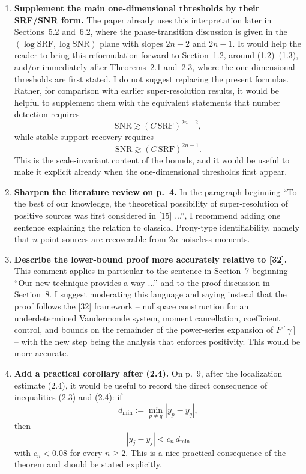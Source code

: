 \documentclass[11pt]{article}
\begin{document}
\begin{enumerate}[leftmargin=2.2em]
\item \textbf{Supplement the main one-dimensional thresholds by their SRF/SNR form.} The
paper already uses this interpretation later in Sections~5.2 and~6.2, where the phase-transition
discussion is given in the $(\log\mathrm{SRF},\log\mathrm{SNR})$ plane with slopes $2n-2$ and
$2n-1$. It would help the reader to bring this reformulation forward to Section~1.2, around
(1.2)--(1.3), and/or immediately after Theorems~2.1 and~2.3, where the one-dimensional
thresholds are first stated. I do not suggest replacing the present formulas. Rather, for
comparison with earlier super-resolution results, it would be helpful to supplement them with the
equivalent statements that number detection requires
\[
\mathrm{SNR}\gtrsim (C\,\mathrm{SRF})^{2n-2},
\]
while stable support recovery requires
\[
\mathrm{SNR}\gtrsim (C\,\mathrm{SRF})^{2n-1}.
\]
This is the scale-invariant content of the bounds, and it would be useful to make it explicit
already when the one-dimensional thresholds first appear.

\item \textbf{Sharpen the literature review on p.~4.} In the paragraph beginning ``To the best of
our knowledge, the theoretical possibility of super-resolution of positive sources was first
considered in [15] ...'', I recommend adding one sentence explaining the relation to classical
Prony-type identifiability, namely that $n$ point sources are recoverable from $2n$ noiseless
moments.

\item \textbf{Describe the lower-bound proof more accurately relative to [32].} This comment
applies in particular to the sentence in Section~7 beginning ``Our new technique provides a
way ...'' and to the proof discussion in Section~8. I suggest moderating this language and saying
instead that the proof follows the [32] framework -- nullspace construction for an
underdetermined Vandermonde system, moment cancellation, coefficient control, and bounds on the
remainder of the power-series expansion of $F[\gamma]$ -- with the new step being the analysis
that enforces positivity. This would be more accurate.

\item \textbf{Add a practical corollary after (2.4).} On p.~9, after the localization estimate
(2.4), it would be useful to record the direct consequence of inequalities (2.3) and (2.4):
if
\[
d_{\min}:=\min_{p\neq q}|y_p-y_q|,
\]
then
\[
|\hat y_j-y_j|< c_n\,d_{\min}
\]
with \(c_n<0.08\) for every \(n\ge2\). This is a nice practical consequence of the theorem and
should be stated explicitly.


\end{enumerate}
\end{document}
